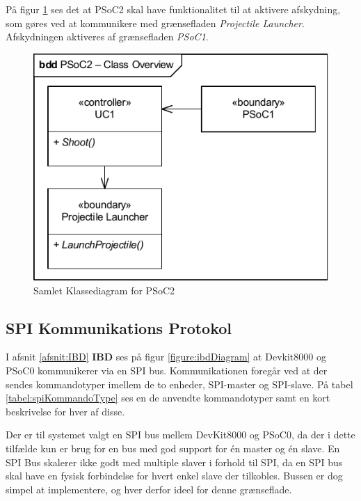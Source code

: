 På figur \ref{fig:CompleteClassDiagramPSoC2} ses det at PSoC2 skal have funktionalitet til at aktivere afskydning, som gøres ved at kommunikere med grænsefladen \textit{Projectile Launcher}. Afskydningen aktiveres af grænsefladen \textit{PSoC1}.
\begin{figure}[H]
	\centering
	\includegraphics[width=\textwidth] {Systemarkitektur/images/CompleteClassDiagramPSoC2}
	\caption{Samlet Klassediagram for PSoC2}
	\label{fig:CompleteClassDiagramPSoC2}
\end{figure}

\subsection{SPI Kommunikations Protokol}
I afsnit \ref{afsnit:IBD} \textbf{IBD} ses på figur \ref{figure:ibdDiagram} at Devkit8000 og PSoC0 kommunikerer via en SPI bus. Kommunikationen foregår ved at der sendes kommandotyper imellem de to enheder, SPI-master og SPI-slave. På tabel \ref{tabel:spiKommandoType} ses en de anvendte kommandotyper samt en kort beskrivelse for hver af disse.

Der er til systemet valgt en SPI bus mellem DevKit8000 og PSoC0, da der i dette tilfælde kun er brug for en bus med god support for én master og én slave. En SPI Bus skalerer ikke godt med multiple slaver i forhold til SPI, da en SPI bus skal have en fysisk forbindelse for hvert enkel slave der tilkobles. Bussen er dog simpel at implementere, og hver derfor ideel for denne grænseflade.

